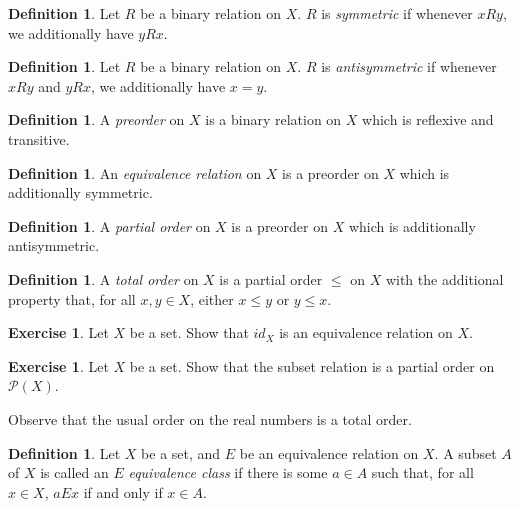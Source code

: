 \documentclass[letterpaper]{article}
\theoremstyle{definition}
\newtheorem{definition}[theorem]{Definition}
\newtheorem{exercise}[theorem]{Exercise}
\newcommand{\defterm}{\emph}
\newcommand{\powerset}{\mathcal{P}}
\begin{document}
\begin{definition}
  Let \(R\) be a binary relation on \(X\).  \(R\) is
  \defterm{symmetric} if whenever \(xRy\), we additionally have
  \(yRx\).
\end{definition}

\begin{definition}
  Let \(R\) be a binary relation on \(X\).  \(R\) is
  \defterm{antisymmetric} if whenever \(xRy\) and \(yRx\), we
  additionally have \(x = y\).
\end{definition}

\begin{definition}
  A \defterm{preorder} on \(X\) is a binary relation on \(X\) which is
  reflexive and transitive.
\end{definition}

\begin{definition}
  An \defterm{equivalence relation} on \(X\) is a preorder on \(X\)
  which is additionally symmetric.
\end{definition}

\begin{definition}
  A \defterm{partial order} on \(X\) is a preorder on \(X\) which is
  additionally antisymmetric.
\end{definition}

\begin{definition}
  A \defterm{total order} on \(X\) is a partial order \(\leq\) on
  \(X\) with the additional property that, for all \(x,y \in X\),
  either \(x \leq y\) or \(y \leq x\).
\end{definition}

\begin{exercise}
  Let \(X\) be a set.  Show that \(id_X\) is an equivalence relation
  on \(X\).
\end{exercise}

\begin{exercise}
  Let \(X\) be a set.  Show that the subset relation is a partial
  order on \(\powerset(X)\).
\end{exercise}

Observe that the usual order on the real numbers is a total order.

\begin{definition}
  Let \(X\) be a set, and \(E\) be an equivalence relation on \(X\).
  A subset \(A\) of \(X\) is called an \(E\) \defterm{equivalence
    class} if there is some \(a \in A\) such that, for all \(x \in
  X\), \(aEx\) if and only if \(x \in A\).
\end{definition}
\end{document}
